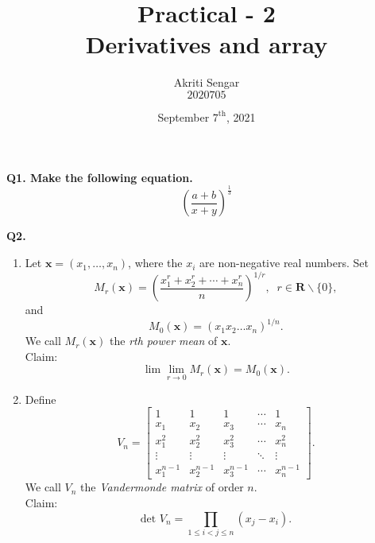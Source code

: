 \documentclass{article}
\title{\textbf{Practical - 2} \\ Derivatives and array}
\author{Akriti Sengar \\ $2020705$}
\date{September $7^{\text{th}}$, 2021}
\begin{document}
	\maketitle
	\noindent \textbf{Q1. Make the following equation.}
	\[ \left( \frac{a+b}{x+y} \right)^{\frac{1}{3}}\]
	
	\noindent \textbf{Q2. }
	\begin{enumerate}
		\item Let $\mathbf{x} = (x_1,\dots,x_n) $, where the $x_i$ are non-negative real numbers. Set \[ M_r(\mathbf{x}) = \left( \frac{x_1^r+x_2^r+\cdots +x_n^r}{n} \right)^{1/r} , \; \; r \in \mathbf{R} \backslash \{0\}, \] and \[ M_0(\mathbf{x}) = (x_1x_2\dots x_n)^{1/n}. \] We call $M_r(\mathbf{x})$ the \textit{rth power mean} of $\mathbf{x}.$ \\
		Claim: \[ \lim\lim\limits_{r \to 0}  M_r(\mathbf{x}) = M_0(\mathbf{x}). \]
		\item Define \[V_n = \left[ \begin{array}{ccccc}
			1 & 1 & 1 & \cdots & 1 \\ 
			x_1 & x_2 & x_3 & \cdots & x_n \\ 
			x_1^2 & x_2^2 & x_3^2 & \cdots & x_n^2 \\
			\vdots & \vdots & \vdots & \ddots & \vdots \\
			x_1^{n-1} & x_2^{n-1} & x_3^{n-1} & \cdots & x_n^{n-1}
		\end{array} \right]. \] 
		We call $V_n$ the \textit{Vandermonde matrix} of order $n$. \\
		Claim: \[ \text{det } V_n = \prod\limits_{1 \leq i < j \leq n} (x_j-x_i). \] 
	\end{enumerate}
	
\end{document}
